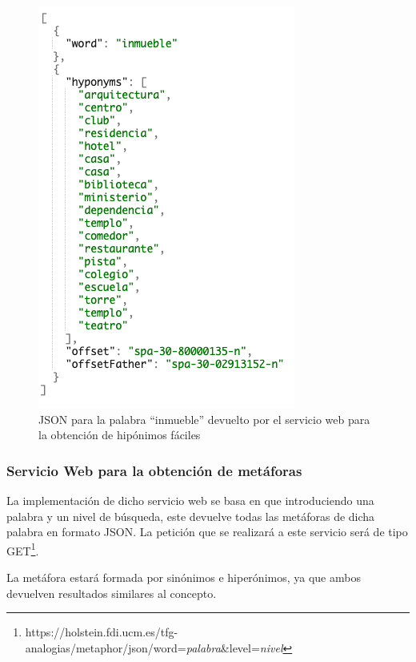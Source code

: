 \begin{figure}[!h]
	\includegraphics[width=.6\textwidth]{Imagenes/Bitmap/Capitulo4/JSON-SW/peticionGetEasyHyponym.png}
	\centering
	\caption{JSON para la palabra ``inmueble'' devuelto por el servicio web para la obtención de hipónimos fáciles}
	\label{fig:peticionGetEasyHyponym}
\end{figure}


\subsubsection{Servicio Web para la obtención de metáforas}
\label{cap:subsec:sw_metaforas}
La implementación de dicho servicio web se basa en que introduciendo una palabra y un nivel de búsqueda, este devuelve todas las metáforas de dicha palabra en formato JSON. La petición que se realizará a este servicio será de tipo GET\footnote{https://holstein.fdi.ucm.es/tfg-analogias/metaphor/json/word=\textit{palabra}\&level=\textit{nivel}}.

La metáfora estará formada por sinónimos e hiperónimos, ya que ambos devuelven resultados similares al concepto.

